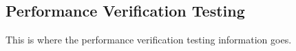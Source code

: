 \subsection{Performance Verification Testing}
This is where the performance verification testing information goes.

